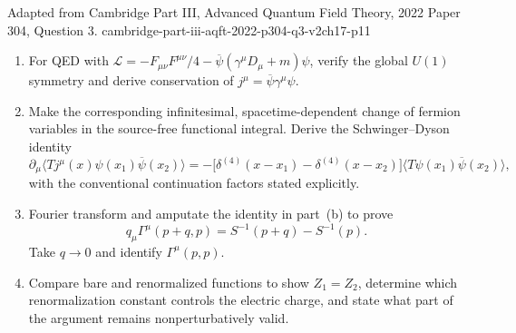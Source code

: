 \begin{enumerate}
  {Adapted from Cambridge Part III, Advanced Quantum Field Theory, 2022 Paper 304, Question 3.}
  {cambridge-part-iii-aqft-2022-p304-q3-v2ch17-p11}
  \begin{enumerate}
    \item[(a)]
    For QED with
    \(\mathcal L=-F_{\mu\nu}F^{\mu\nu}/4
      -\overline\psi(\gamma^\mu D_\mu+m)\psi\),
    verify the global \(U(1)\) symmetry and derive conservation of
    \(j^\mu=\overline\psi\gamma^\mu\psi\).
    \item[(b)]
    Make the corresponding infinitesimal, spacetime-dependent change of
    fermion variables in the source-free functional integral.  Derive the
    Schwinger--Dyson identity
    \[
      \partial_\mu
      \langle Tj^\mu(x)\psi(x_1)\overline\psi(x_2)\rangle
       =-\bigl[\delta^{(4)}(x-x_1)-\delta^{(4)}(x-x_2)\bigr]
        \langle T\psi(x_1)\overline\psi(x_2)\rangle,
    \]
    with the conventional continuation factors stated explicitly.
    \item[(c)]
    Fourier transform and amputate the identity in part~(b) to prove
    \[
      q_\mu\Gamma^\mu(p+q,p)
        =S^{-1}(p+q)-S^{-1}(p).
    \]
    Take \(q\to0\) and identify \(\Gamma^\mu(p,p)\).
    \item[(d)]
    Compare bare and renormalized functions to show \(Z_1=Z_2\), determine
    which renormalization constant controls the electric charge, and state
    what part of the argument remains nonperturbatively valid.
  \end{enumerate}

\end{enumerate}
